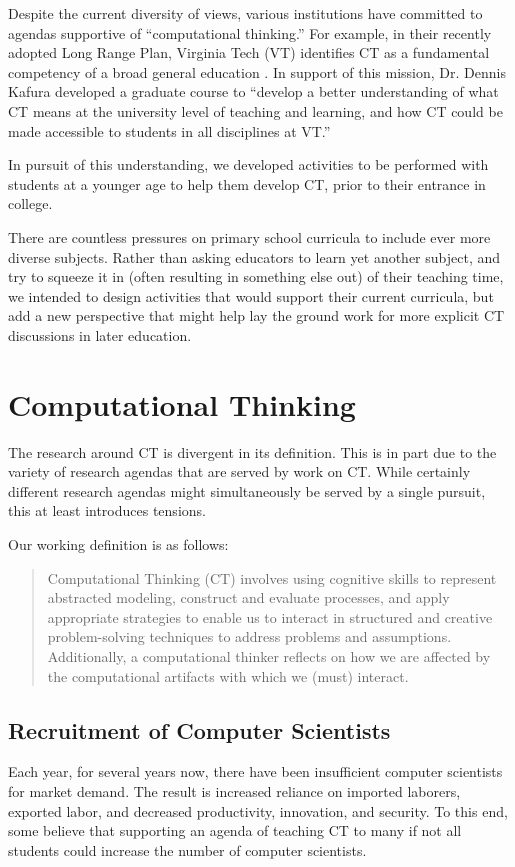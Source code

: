 \documentclass{acm_proc_article-sp}
\begin{document}
Despite the current diversity of views, various institutions have committed to agendas supportive of ``computational thinking.'' 
For example, in their recently adopted Long Range Plan, Virginia Tech (VT) identifies CT as a fundamental competency of a broad general education \cite{vtlongrange}. 
In support of this mission, Dr. Dennis Kafura developed a graduate course to ``develop a better understanding of what CT means at the university level of teaching and learning, and how CT could be made accessible to students in all disciplines at VT.''

In pursuit of this understanding, we developed activities to be performed with students at a younger age to help them develop CT, prior to their entrance in college.

There are countless pressures on primary school curricula to include ever more diverse subjects.
Rather than asking educators to learn yet another subject, and try to squeeze it in (often resulting in something else out) of their teaching time, we intended to design activities that would support their current curricula, but add a new perspective that might help lay the ground work for more explicit CT discussions in later education.

\section{Computational Thinking}
\label{sec:computational_thinking}
The research around CT is divergent in its definition.
This is in part due to the variety of research agendas that are served by work on CT.
While certainly different research agendas might simultaneously be served by a single pursuit, this at least introduces tensions. 

\begin{samepage}
Our working definition is as follows: 
\begin{quotation}
Computational Thinking (CT) involves using cognitive skills to represent abstracted modeling, construct and evaluate processes, and apply appropriate strategies to enable us to interact in structured and creative problem-solving techniques to address problems and assumptions.
Additionally, a computational thinker reflects on how we are affected by the computational artifacts with which we (must) interact.
\end{quotation}
\end{samepage}

\subsection{Recruitment of Computer Scientists}
\label{sec:recruitment}
Each year, for several years now, there have been insufficient computer scientists for market demand.
The result is increased reliance on imported laborers, exported labor, and decreased productivity, innovation, and security.
To this end, some believe that supporting an agenda of teaching CT to many if not all students could increase the number of computer scientists.
\end{document}

